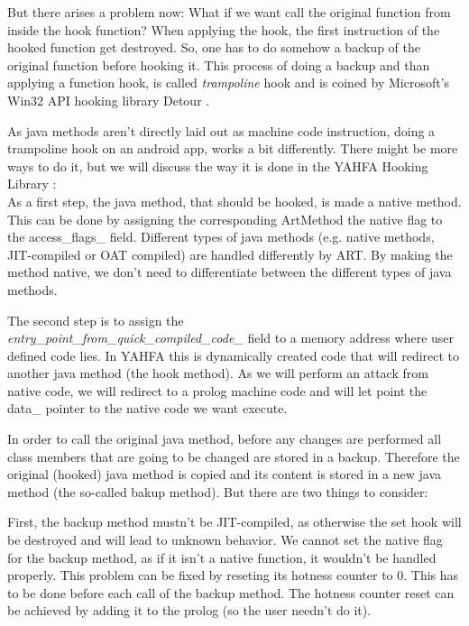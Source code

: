 But there arises a problem now: What if we want call the original function from inside the hook function? When applying the hook, the first instruction of the hooked function get destroyed. So, one has to do somehow a backup of the original function before hooking it. This process of doing a backup and than applying a function hook, is called \emph{trampoline} hook and is coined by Microsoft's Win32 API hooking library Detour \cite{detours-binary-interception-of-win32-functions}.

As java methods aren't directly laid out as machine code instruction, doing a trampoline hook on an android app, works a bit differently. There might be more ways to do it, but we will discuss the way it is done in the YAHFA Hooking Library \cite{YahfaGithub}:\\

As a first step, the java method, that should be hooked, is made a native method. This can be done by assigning the corresponding ArtMethod the native flag to the access\_flags\_ field. Different types of java methods (e.g. native methods, JIT-compiled or OAT compiled) are handled differently by ART. By making the method native, we don't need to differentiate between the different types of java methods.

The second step is to assign the \\\emph{entry\_point\_from\_quick\_compiled\_code\_} field to a memory address where user defined code lies. In YAHFA this is dynamically created code that will redirect to another java method (the hook method). As we will perform an attack from native code, we will redirect to a prolog machine code and will let point the data\_ pointer to the native code we want execute.

In order to call the original java method, before any changes are performed all class members that are going to be changed are stored in a backup. 
Therefore the original (hooked) java method is copied and its content is stored in a new java method (the so-called bakup method).
But there are two things to consider:

First, the backup method mustn't be JIT-compiled, as otherwise the set hook will be destroyed and will lead to unknown behavior. 
We cannot set the native flag for the backup method, as if it isn't a native function, it wouldn't be handled properly.
This problem can be fixed by reseting its hotness counter to 0. This has to be done before each call of the backup method. The hotness counter reset can be achieved by adding it to the prolog (so the user needn't do it).

